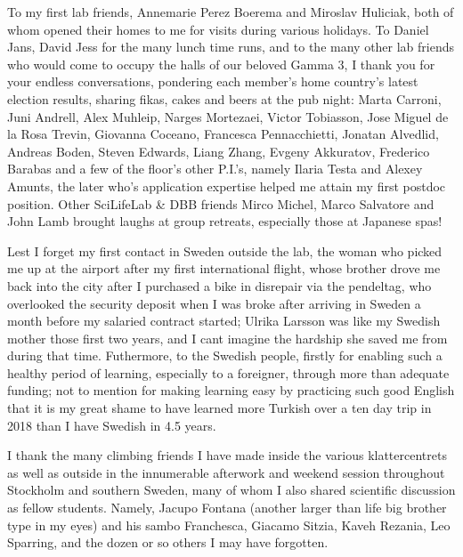 To my first lab friends, Annemarie Perez Boerema and Miroslav Huliciak, both of whom opened their homes to me for visits during various holidays. To Daniel Jans, David Jess for the many lunch time runs, and to the many other lab friends who would come to occupy the halls of our beloved Gamma 3, I thank you for your endless conversations, pondering each member's home country's latest election results, sharing fikas, cakes and beers at the pub night: Marta Carroni, Juni Andrell, Alex Muhleip, Narges Mortezaei, Victor Tobiasson, Jose Miguel de la Rosa Trevin, Giovanna Coceano, Francesca Pennacchietti, Jonatan Alvedlid, Andreas Boden, Steven Edwards, Liang Zhang, Evgeny Akkuratov, Frederico Barabas and a few of the floor's other P.I.'s, namely Ilaria Testa and Alexey Amunts, the later who's application expertise helped me attain my first postdoc position. Other SciLifeLab \& DBB friends Mirco Michel, Marco Salvatore and John Lamb brought laughs at group retreats, especially those at Japanese spas!

Lest I forget my first contact in Sweden outside the lab, the woman who picked me up at the airport after my first international flight, whose brother drove me back into the city after I purchased a bike in disrepair via the pendeltag, who overlooked the security deposit when I was broke after arriving in Sweden a month before my salaried contract started; Ulrika Larsson was like my Swedish mother those first two years, and I cant imagine the hardship she saved me from during that time. Futhermore, to the Swedish people, firstly for enabling such a healthy period of learning, especially to a foreigner, through more than adequate funding; not to mention for making learning easy by practicing such good English that it is my great shame to have learned more Turkish over a ten day trip in 2018 than I have Swedish in 4.5 years.

I thank the many climbing friends I have made inside the various klattercentrets as well as outside in the innumerable afterwork and weekend session throughout Stockholm and southern Sweden, many of whom I also shared scientific discussion as fellow students. Namely, Jacupo Fontana (another larger than life big brother type in my eyes) and his sambo Franchesca, Giacamo Sitzia, Kaveh Rezania, Leo Sparring, and the dozen or so others I may have forgotten.

